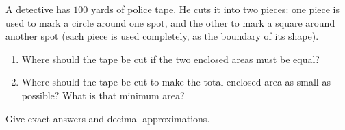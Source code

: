 A detective has $100$ yards of police tape. He cuts it into two pieces: one piece is used to mark a circle around one spot, and the other to mark a square around another spot (each piece is used completely, as the boundary of its shape).
\begin{enumerate}
\item[(a)] Where should the tape be cut if the two enclosed areas must be equal?
\item[(b)] Where should the tape be cut to make the total enclosed area as small as possible? What is that minimum area?
\end{enumerate}
Give exact answers and decimal approximations.
